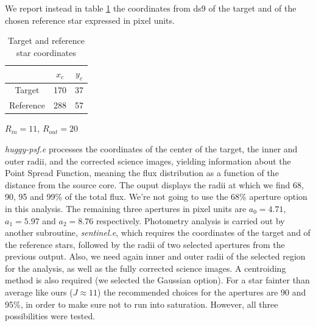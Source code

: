 \documentclass{aa}
\begin{document}
We report instead in table \ref{table:c} the coordinates from ds9 of the target and of the chosen reference star expressed in pixel units.
\begin{table}[h!]
\centering
    \begin{tabular}{ccc}
    \hline
     & $x_c$ & $y_c$ \\
    \hline
    Target    &  170  &  37    \\
    Reference & 288 & 57  \\
    \hline
    \end{tabular}
\caption{Target and reference star coordinates}
\label{table:c}
\end{table}
\begin{center}
    $R_{in} = 11$, $R_{out} = 20$
\end{center}
\textit{huggy-psf.e} processes the coordinates of the center of the target, the inner and outer radii, and the corrected science images, yielding information about the Point Spread Function, meaning the flux distribution as a function of the distance from the source core. The ouput displays the radii at which we find 68, 90, 95 and 99\% of the total flux. We're not going to use the 68\% aperture option in this analysis. The remaining three apertures in pixel units are $a_0=4.71$, $a_1=5.97$ and $a_2=8.76$ respectively. 
Photometry analysis is carried out by another subroutine, \textit{sentinel.e}, which requires the coordinates of the target and of the reference stars, followed by the radii of two selected apertures from the previous output. Also, we need again inner and outer radii of the selected region for the analysis, as well as the fully corrected science images. A centroiding method is also required (we selected the Gaussian option). For a star fainter than average like ours ($J\approx 11$) the recommended choices for the apertures are 90 and 95\%, in order to make sure not to run into saturation. However, all three possibilities were tested. 

\medskip
\end{document}
